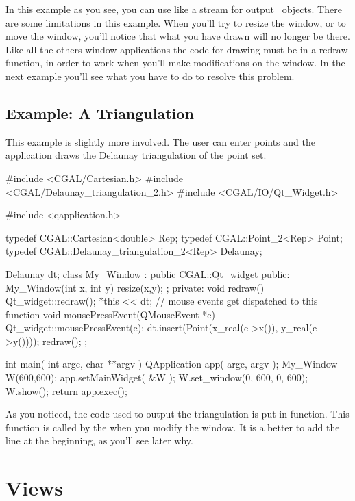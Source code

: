 In this example as you see, you can use  like a stream for output \cgal\ objects.
 There are some limitations in this example. When you'll try to resize the window, or to 
move the window, you'll notice that what you have drawn will no longer be there. Like all
the others window applications the code for drawing must be in a redraw function, in order
to work when you'll make modifications on the window. In the next example you'll see what
you have to do to resolve this problem.


\subsection{Example: A Triangulation}

This example is slightly more involved. The user can enter points and the application
draws the Delaunay triangulation of the point set. 

\begin{ccExampleCode}
#include <CGAL/Cartesian.h>
#include <CGAL/Delaunay_triangulation_2.h>
#include <CGAL/IO/Qt_Widget.h>

#include <qapplication.h>

typedef CGAL::Cartesian<double>             Rep;
typedef CGAL::Point_2<Rep>                  Point;
typedef CGAL::Delaunay_triangulation_2<Rep> Delaunay;

Delaunay dt;
class My_Window : public CGAL::Qt_widget {
public:
  My_Window(int x, int y){ resize(x,y); };
private:
  void redraw()
  {
    Qt_widget::redraw();
    *this << dt;
  }  
  // mouse events get dispatched to this function
  void mousePressEvent(QMouseEvent *e)
  {
    Qt_widget::mousePressEvent(e);
    dt.insert(Point(x_real(e->x()), y_real(e->y())));
    redraw();
  }
};

int main( int argc, char **argv )
{
    QApplication app( argc, argv );
    My_Window W(600,600);
    app.setMainWidget( &W );
    W.set_window(0, 600, 0, 600);
    W.show();
    return app.exec();
}
\end{ccExampleCode}

As you noticed, the code used to output the triangulation is put in  function.
This function is called by the  when you modify the window. It is a better to
add the line  at the beginning, as you'll see later why.

\section{Views}
\label{Qt_widget_views}

